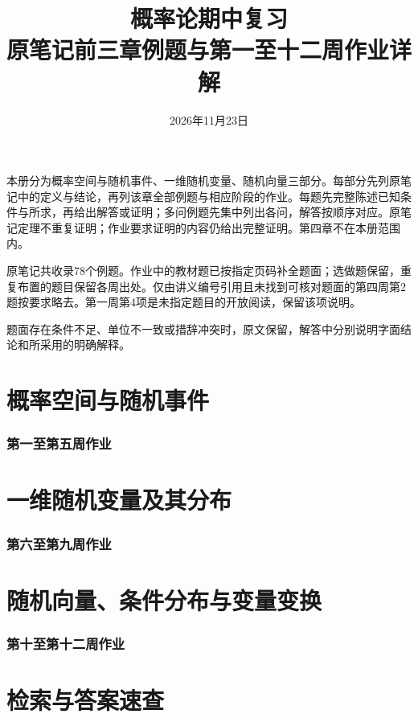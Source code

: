 \documentclass[UTF8,a4paper,11pt,fontset=windows]{ctexart}
\title{概率论期中复习\\\large 原笔记前三章例题与第一至十二周作业详解}
\author{}\date{2026年11月23日}
\begin{document}
\maketitle
\noindent 本册分为概率空间与随机事件、一维随机变量、随机向量三部分。每部分先列原笔记中的定义与结论，再列该章全部例题与相应阶段的作业。每题先完整陈述已知条件与所求，再给出解答或证明；多问例题先集中列出各问，解答按顺序对应。原笔记定理不重复证明；作业要求证明的内容仍给出完整证明。第四章不在本册范围内。

原笔记共收录78个例题。作业中的教材题已按指定页码补全题面；选做题保留，重复布置的题目保留各周出处。仅由讲义编号引用且未找到可核对题面的第四周第2题按要求略去。第一周第4项是未指定题目的开放阅读，保留该项说明。

题面存在条件不足、单位不一致或措辞冲突时，原文保留，解答中分别说明字面结论和所采用的明确解释。
\tableofcontents
\clearpage
\part{概率空间与随机事件}

\clearpage\section*{第一至第五周作业}

\clearpage\part{一维随机变量及其分布}

\clearpage\section*{第六至第九周作业}

\clearpage\part{随机向量、条件分布与变量变换}

\clearpage\section*{第十至第十二周作业}

\clearpage\part{检索与答案速查}

\end{document}
